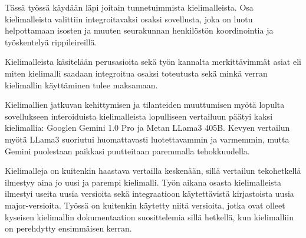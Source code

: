 Tässä työssä käydään läpi joitain tunnetuimmista kielimalleista. Osa
kielimalleista valittiin integroitavaksi osaksi sovellusta, joka on luotu
helpottamaan isosten ja muuten seurakunnan henkilöstön koordinointia ja
työskentelyä rippileireillä.

Kielimalleista käsitelään perusasioita sekä työn kannalta merkittävimmät asiat
eli miten kielimalli saadaan integroitua osaksi toteutusta sekä minkä verran
kielimallin käyttäminen tulee maksamaan.

Kielimallien jatkuvan kehittymisen ja tilanteiden muuttumisen myötä lopulta
sovellukseen interoiduista kielimalleista lopulliseen vertailuun päätyi kaksi
kielimallia: Googlen Gemini 1.0 Pro ja Metan LLama3 405B. Kevyen vertailun
myötä LLama3 suoriutui huomattavasti luotettavammin ja varmemmin, mutta Gemini
puolestaan paikkasi puutteitaan paremmalla tehokkuudella.

Kielimalleja on kuitenkin haastava vertailla keskenään, sillä vertailun
tekohetkellä ilmestyy aina jo uusi ja parempi kielimalli. Työn aikana osasta
kielimalleista ilmestyi useita uusia versioita sekä integraatioon käytettävistä
kirjastoista uusia major-versioita. Työssä on kuitenkin käytetty niitä
versioita, jotka ovat olleet kyseisen kielimallin dokumentaation suosittelemia
sillä hetkellä, kun kielimalliin on perehdytty ensimmäisen kerran.
